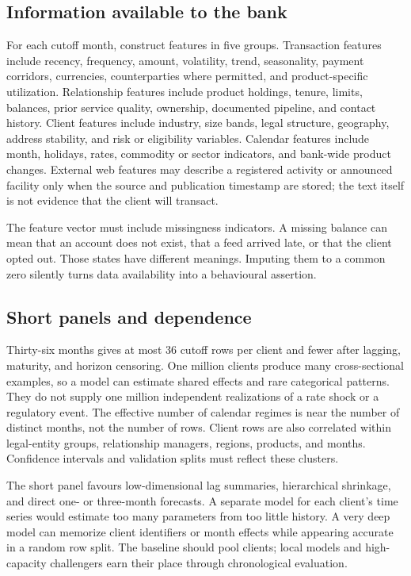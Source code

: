 \subsection{Information available to the bank}

For each cutoff month, construct features in five groups. Transaction features include recency, frequency, amount, volatility, trend, seasonality, payment corridors, currencies, counterparties where permitted, and product-specific utilization. Relationship features include product holdings, tenure, limits, balances, prior service quality, ownership, documented pipeline, and contact history. Client features include industry, size bands, legal structure, geography, address stability, and risk or eligibility variables. Calendar features include month, holidays, rates, commodity or sector indicators, and bank-wide product changes. External web features may describe a registered activity or announced facility only when the source and publication timestamp are stored; the text itself is not evidence that the client will transact.

The feature vector must include missingness indicators. A missing balance can mean that an account does not exist, that a feed arrived late, or that the client opted out. Those states have different meanings. Imputing them to a common zero silently turns data availability into a behavioural assertion.

\subsection{Short panels and dependence}

Thirty-six months gives at most 36 cutoff rows per client and fewer after lagging, maturity, and horizon censoring. One million clients produce many cross-sectional examples, so a model can estimate shared effects and rare categorical patterns. They do not supply one million independent realizations of a rate shock or a regulatory event. The effective number of calendar regimes is near the number of distinct months, not the number of rows. Client rows are also correlated within legal-entity groups, relationship managers, regions, products, and months. Confidence intervals and validation splits must reflect these clusters.

The short panel favours low-dimensional lag summaries, hierarchical shrinkage, and direct one- or three-month forecasts. A separate model for each client's time series would estimate too many parameters from too little history. A very deep model can memorize client identifiers or month effects while appearing accurate in a random row split. The baseline should pool clients; local models and high-capacity challengers earn their place through chronological evaluation.

